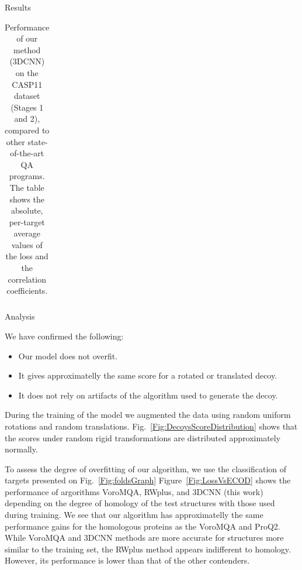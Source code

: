 \documentclass[final, unknownkeysallowed]{beamer}
\begin{document}
\begin{frame}{}
\begin{textblock}{39.0}
\begin{block}{Results}
\begin{table}[H]
\begin{center}
\begin{tabular}{ c | c | c | c | c }
\end{tabular}
\vspace{0.25cm}    
    \captionsetup{width=0.8\linewidth}
    \caption {Performance of our method (3DCNN) on the CASP11 dataset
      (Stages 1 and 2), compared to other state-of-the-art QA
      programs. The table shows the absolute, per-target average
      values of the loss and the correlation coefficients.}
    \label{Tbl:TestResults}
\end{center}
\end{table}

\end{block}

\begin{block}{Analysis}

We have confirmed the following:
\begin{itemize}
\item Our model does not overfit.
\item It gives approximatelly the same score for a rotated or
  translated decoy.
\item It does not rely on artifacts of the algorithm used to generate
  the decoy.
\end{itemize}

\vspace{0.5cm}
During the training of the model we augmented the data using random
uniform rotations and random
translations. Fig.~\ref{Fig:DecoysScoreDistribution} shows that the
scores under random rigid transformations are distributed
approximately normally.

\vspace{0.5cm}
To assess the degree of overfitting of our algorithm, we use the
classification of targets presented on Fig.~\ref{Fig:foldsGraph}
Figure~\ref{Fig:LossVsECOD} shows the performance of argorithms
VoroMQA, RWplus, and 3DCNN (this work) depending on the degree of
homology of the test structures with those used during training.  We
see that our algorithm has approximatelly the same performance gains
for the homologous proteins as the VoroMQA and ProQ2.
%
%
While VoroMQA and 3DCNN methods are more accurate for structures more
similar to the training set, the RWplus method appears indifferent to
homology. However, its performance is lower than that of the other
contenders.


\end{block}
\end{textblock}
\end{frame}
\end{document}
